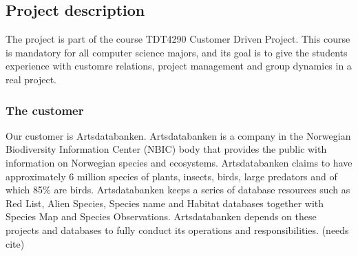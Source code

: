\subsection{Project description}
The project is part of the course TDT4290 Customer Driven Project. This course is mandatory for all computer science majors, and its goal is to give the students experience with customre relations, project management and group dynamics in a real project.

\subsubsection{The customer}
Our customer is Artsdatabanken. Artsdatabanken is a company in the Norwegian Biodiversity Information Center (NBIC) body that provides the public with information on Norwegian species and ecosystems. Artsdatabanken claims to have approximately 6 million species of plants, insects, birds, large predators and of which 85\% are birds. Artsdatabanken keeps a series of database resources such as Red List, Alien Species, Species name and Habitat databases together with Species Map and Species Observations. Artsdatabanken depends on these projects and databases to fully conduct its operations and responsibilities. (needs cite)
